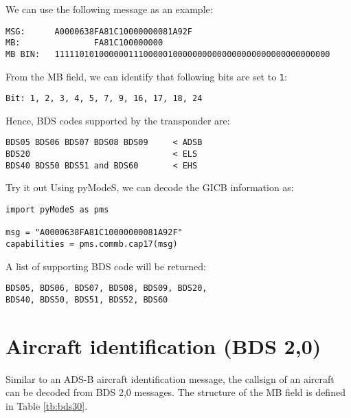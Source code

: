 We can use the following message as an example:

\begin{verbatim}
MSG:      A0000638FA81C10000000081A92F
MB:               FA81C100000000
MB BIN:   11111010100000011100000100000000000000000000000000000000
\end{verbatim}

From the MB field, we can identify that following bits are set to \texttt{1}:

\begin{verbatim}
Bit: 1, 2, 3, 4, 5, 7, 9, 16, 17, 18, 24
\end{verbatim}

Hence, BDS codes supported by the transponder are: 
\begin{verbatim}
BDS05 BDS06 BDS07 BDS08 BDS09     < ADSB
BDS20                             < ELS
BDS40 BDS50 BDS51 and BDS60       < EHS
\end{verbatim}
  
\begin{notebox}{Try it out}
Using pyModeS, we can decode the GICB information as: 

\begin{verbatim}
import pyModeS as pms

msg = "A0000638FA81C10000000081A92F"
capabilities = pms.commb.cap17(msg)
\end{verbatim}

A list of supporting BDS code will be returned:

\begin{verbatim}
BDS05, BDS06, BDS07, BDS08, BDS09, BDS20, 
BDS40, BDS50, BDS51, BDS52, BDS60
\end{verbatim}

\end{notebox}

\clearpage

\section{Aircraft identification (BDS 2,0)}

Similar to an ADS-B aircraft identification message, the callsign of an aircraft can be decoded from BDS 2,0 messages. The structure of the MB field is defined in Table \ref{tb:bds30}.

